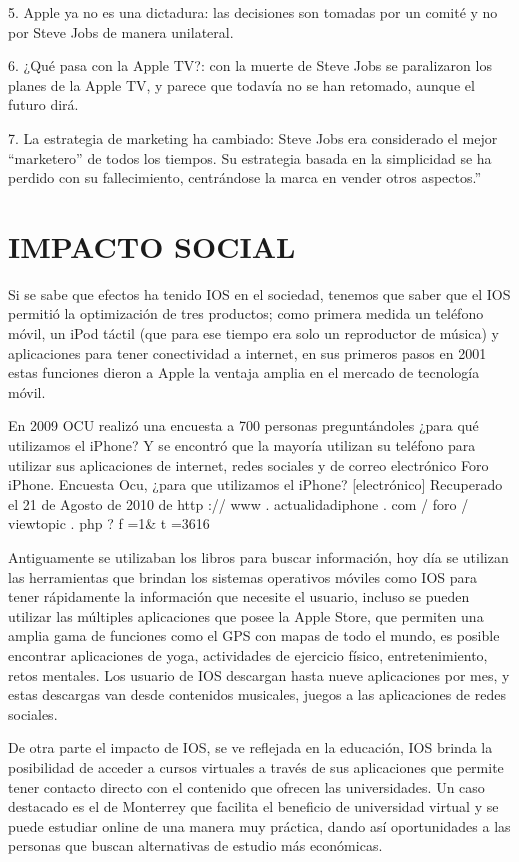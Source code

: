 5. Apple ya no es una dictadura: las decisiones son tomadas
por un comité y no por Steve Jobs de manera unilateral.

6. ¿Qué pasa con la Apple TV?: con la muerte de Steve Jobs se
paralizaron los planes de la Apple TV, y parece que todavía no se
han retomado, aunque el futuro dirá.

7. La estrategia de marketing ha cambiado: Steve Jobs era
considerado el mejor “marketero” de todos los tiempos. Su
estrategia basada en la simplicidad se ha perdido con su
fallecimiento, centrándose la marca en vender otros aspectos.”

\section*{IMPACTO SOCIAL}

Si se sabe que efectos ha tenido IOS en el sociedad, tenemos
que saber que el IOS permitió la optimización de tres productos;
como primera medida un teléfono móvil, un iPod táctil (que para
ese tiempo era solo un reproductor de música) y aplicaciones
para tener conectividad a internet, en sus primeros pasos en
2001 estas funciones dieron a Apple la ventaja amplia en el
mercado de tecnología móvil.

En 2009 OCU realizó una encuesta a 700 personas
preguntándoles ¿para qué utilizamos el iPhone? Y se encontró
que la mayoría utilizan su teléfono para utilizar sus aplicaciones
de internet, redes sociales y de correo electrónico
Foro iPhone. Encuesta Ocu, ¿para que utilizamos el
iPhone? [electrónico] Recuperado el 21 de Agosto de 2010
de http :// www . actualidadiphone . com / foro / viewtopic . php ?
f =1& t =3616

Antiguamente se utilizaban los libros para buscar información,
hoy día se utilizan las herramientas que brindan los sistemas
operativos móviles como IOS para tener rápidamente la
información que necesite el usuario, incluso se pueden utilizar
las múltiples aplicaciones que posee la Apple Store, que
permiten una amplia gama de funciones como el GPS con mapas
de todo el mundo, es posible encontrar aplicaciones de yoga,
actividades de ejercicio físico, entretenimiento, retos mentales.
Los usuario de IOS descargan hasta nueve aplicaciones por mes,
y estas descargas van desde contenidos musicales, juegos a las
aplicaciones de redes sociales.

De otra parte el impacto de IOS, se ve reflejada en la educación,
IOS brinda la posibilidad de acceder a cursos virtuales a través
de sus aplicaciones que permite tener contacto directo con el
contenido que ofrecen las universidades. Un caso destacado es
el de Monterrey que facilita el beneficio de universidad virtual y
se puede estudiar online de una manera muy práctica, dando así
oportunidades a las personas que buscan alternativas de estudio
más económicas.

